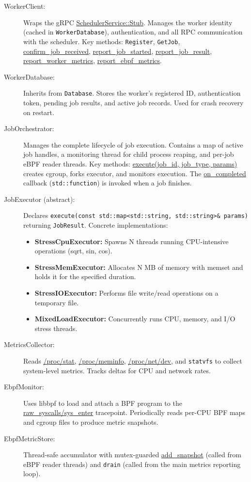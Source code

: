 \begin{description}
	\item[WorkerClient:] Wraps the gRPC \url{SchedulerService::Stub}. Manages the worker identity (cached in \texttt{WorkerDatabase}), authentication, and all RPC communication with the scheduler. Key methods: \texttt{Register}, \texttt{GetJob}, \url{confirm_job_received}, \url{report_job_started}, \url{report_job_result}, \url{report_worker_metrics}, \url{report_ebpf_metrics}.

	\item[WorkerDatabase:] Inherits from \texttt{Database}. Stores the worker's registered ID, authentication token, pending job results, and active job records. Used for crash recovery on restart.

	\item[JobOrchestrator:] Manages the complete lifecycle of job execution. Contains a map of active job handles, a monitoring thread for child process reaping, and per-job eBPF reader threads. Key methods: \url{execute(job_id, job_type, params)} creates cgroup, forks executor, and monitors execution. The \url{on_completed} callback (\texttt{std::function}) is invoked when a job finishes.

	\item[JobExecutor (abstract):] Declares \texttt{execute(const std::map<std::string, std::string>\& params)} returning \texttt{JobResult}. Concrete implementations:
		\begin{itemize}
			\item \textbf{StressCpuExecutor:} Spawns N threads running CPU-intensive operations (sqrt, sin, cos).
			\item \textbf{StressMemExecutor:} Allocates N MB of memory with memset and holds it for the specified duration.
			\item \textbf{StressIOExecutor:} Performs file write/read operations on a temporary file.
			\item \textbf{MixedLoadExecutor:} Concurrently runs CPU, memory, and I/O stress threads.
		\end{itemize}

	\item[MetricsCollector:] Reads \url{/proc/stat}, \url{/proc/meminfo}, \url{/proc/net/dev}, and \texttt{statvfs} to collect system-level metrics. Tracks deltas for CPU and network rates.

	\item[EbpfMonitor:] Uses libbpf to load and attach a BPF program to the \url{raw_syscalls/sys_enter} tracepoint. Periodically reads per-CPU BPF maps and cgroup files to produce metric snapshots.

	\item[EbpfMetricStore:] Thread-safe accumulator with mutex-guarded \url{add_snapshot} (called from eBPF reader threads) and \texttt{drain} (called from the main metrics reporting loop).
\end{description}

